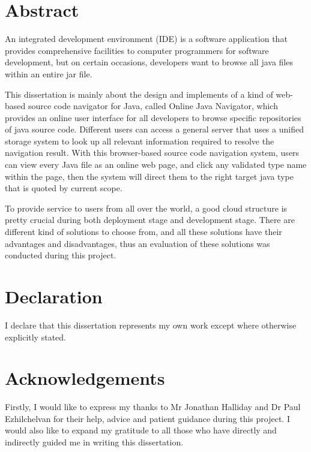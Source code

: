 \documentclass[runningheads]{llncs}
\begin{document}
\newpage
{}
\setcounter{page}{2}
\section*{Abstract}
An integrated development environment (IDE) is a software application that provides comprehensive facilities to computer programmers for software development\cite{Integrated_development_environment}, but on certain occasions, developers want to browse all java files within an entire jar file.

This dissertation is mainly about the design and implements of a kind of web-based source code navigator for Java, called Online Java Navigator, which provides an online user interface for all developers to browse specific repositories of java source code. Different users can access a general server that uses a unified storage system to look up all relevant information required to resolve the navigation result. With this browser-based source code navigation system, users can view every Java file as an online web page, and click any validated type name within the page, then the system will direct them to the right target java type that is quoted by current scope.

To provide service to users from all over the world, a good cloud structure is pretty crucial during both deployment stage and development stage. There are different kind of solutions to choose from, and all these solutions have their advantages and disadvantages, thus an evaluation of these solutions was conducted during this project.

\section*{Declaration}

I declare that this dissertation represents my own work except where otherwise explicitly stated.

\newpage
\section*{Acknowledgements}

Firstly, I would like to express my thanks to Mr Jonathan Halliday and Dr Paul Ezhilchelvan for their help, advice and patient guidance during this project. I would also like to expand my gratitude to all those who have directly and indirectly guided me in writing this dissertation.
\end{document}
